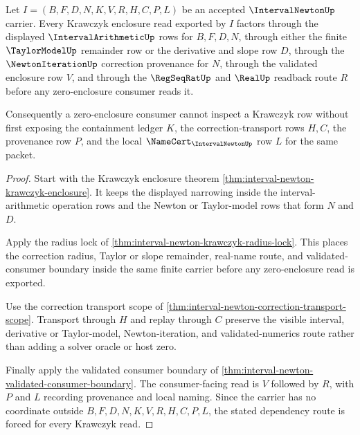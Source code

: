 \begin{theorem}
\label{thm:interval-newton-krawczyk-scope}
Let $I=(B,F,D,N,K,V,R,H,C,P,L)$ be an accepted $\IntervalNewtonUp$ carrier. Every Krawczyk enclosure read exported by $I$ factors through the displayed $\IntervalArithmeticUp$ rows for $B,F,D,N$, through either the finite $\TaylorModelUp$ remainder row or the derivative and slope row $D$, through the $\NewtonIterationUp$ correction provenance for $N$, through the validated enclosure row $V$, and through the $\RegSeqRatUp$ and $\RealUp$ readback route $R$ before any zero-enclosure consumer reads it.

Consequently a zero-enclosure consumer cannot inspect a Krawczyk row without first exposing the containment ledger $K$, the correction-transport rows $H,C$, the provenance row $P$, and the local $\NameCert_{\IntervalNewtonUp}$ row $L$ for the same packet.
\end{theorem}
\begin{proof}
Start with the Krawczyk enclosure theorem \autoref{thm:interval-newton-krawczyk-enclosure}. It keeps the displayed narrowing inside the interval-arithmetic operation rows and the Newton or Taylor-model rows that form $N$ and $D$.

Apply the radius lock of \autoref{thm:interval-newton-krawczyk-radius-lock}. This places the correction radius, Taylor or slope remainder, real-name route, and validated-consumer boundary inside the same finite carrier before any zero-enclosure read is exported.

Use the correction transport scope of \autoref{thm:interval-newton-correction-transport-scope}. Transport through $H$ and replay through $C$ preserve the visible interval, derivative or Taylor-model, Newton-iteration, and validated-numerics route rather than adding a solver oracle or host zero.

Finally apply the validated consumer boundary of \autoref{thm:interval-newton-validated-consumer-boundary}. The consumer-facing read is $V$ followed by $R$, with $P$ and $L$ recording provenance and local naming. Since the carrier has no coordinate outside $B,F,D,N,K,V,R,H,C,P,L$, the stated dependency route is forced for every Krawczyk read.
\end{proof}


